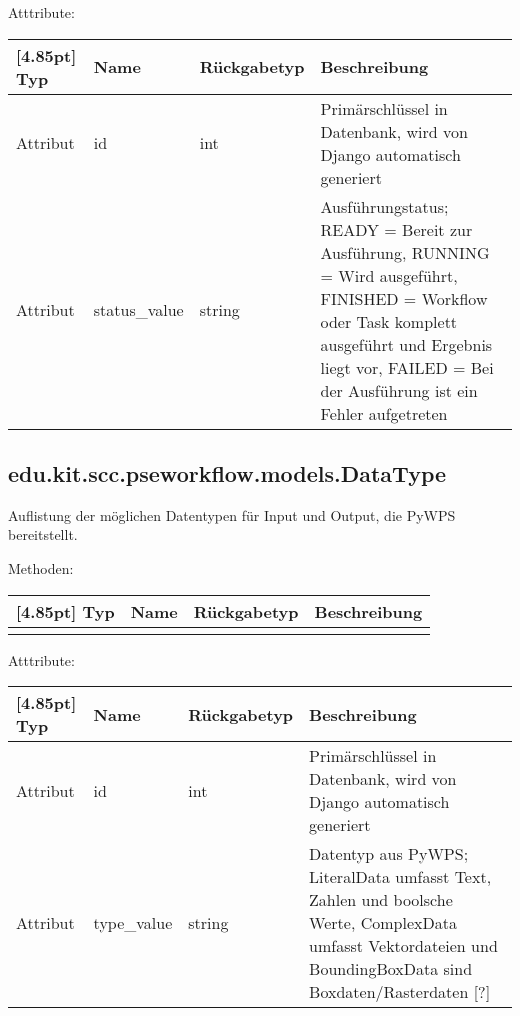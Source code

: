 			Atttribute:
			\begin{center}
				\setlength\tabcolsep{5pt}
				\renewcommand{\arraystretch}{1.5}
				
				\begin{tabularx}{\textwidth}{|l|l|l|X|}
					\hline
					\rowcolor[gray]{0.75}[4.85pt]
					Typ & Name & Rückgabetyp & Beschreibung \\ \hline 
	           		Attribut & id & int & Primärschlüssel in Datenbank, wird von Django automatisch generiert \\ \hline
	           		Attribut & status\_value & string & Ausführungstatus; READY = Bereit zur Ausführung, RUNNING = Wird ausgeführt, FINISHED = Workflow oder Task komplett ausgeführt und Ergebnis liegt vor, FAILED = Bei der Ausführung ist ein Fehler aufgetreten \\
	           		\hline
				\end{tabularx}
			\end{center}

		\subsection{edu.kit.scc.pseworkflow.models.DataType}
			Auflistung der möglichen Datentypen für Input und Output, die PyWPS bereitstellt.
			
			Methoden:
			\begin{center}
				\setlength\tabcolsep{5pt}
				\renewcommand{\arraystretch}{1.5}
				
				\begin{tabularx}{\textwidth}{|l|l|l|X|}
					\hline
					\rowcolor[gray]{0.75}[4.85pt]
					Typ & Name & Rückgabetyp & Beschreibung \\ \hline 
					&&& \\
					\hline
				\end{tabularx}
			\end{center}
			
			Atttribute:
			\begin{center}
				\setlength\tabcolsep{5pt}
				\renewcommand{\arraystretch}{1.5}
				
				\begin{tabularx}{\textwidth}{|l|l|l|X|}
					\hline
					\rowcolor[gray]{0.75}[4.85pt]
					Typ & Name & Rückgabetyp & Beschreibung \\ \hline 
					Attribut & id & int & Primärschlüssel in Datenbank, wird von Django automatisch generiert \\ \hline
					Attribut & type\_value & string & Datentyp aus PyWPS; LiteralData umfasst Text, Zahlen und boolsche Werte, ComplexData umfasst Vektordateien und BoundingBoxData sind Boxdaten/Rasterdaten [?] \\
					\hline
				\end{tabularx}
			\end{center}
		
